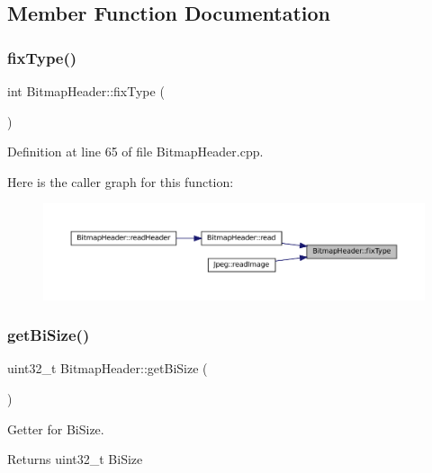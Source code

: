 \subsection{Member Function Documentation}
\mbox{\label{classBitmapHeader_aa02e59db95074c6a96a44dac03cee77b}} 
\subsubsection{\texorpdfstring{fixType()}{fixType()}}
{\footnotesize\ttfamily int Bitmap\+Header\+::fix\+Type (\begin{DoxyParamCaption}{ }\end{DoxyParamCaption})}



Definition at line 65 of file Bitmap\+Header.\+cpp.

Here is the caller graph for this function\+:\nopagebreak
\begin{figure}[H]
\begin{center}
\leavevmode
\includegraphics[width=350pt]{classBitmapHeader_aa02e59db95074c6a96a44dac03cee77b_icgraph}
\end{center}
\end{figure}
\mbox{\label{classBitmapHeader_acce4b6292e2aaf5dbd4bc10687c4fb65}} 
\subsubsection{\texorpdfstring{getBiSize()}{getBiSize()}}
{\footnotesize\ttfamily uint32\+\_\+t Bitmap\+Header\+::get\+Bi\+Size (\begin{DoxyParamCaption}{ }\end{DoxyParamCaption})}



Getter for Bi\+Size. 

\begin{DoxyReturn}{Returns}
uint32\+\_\+t Bi\+Size 
\end{DoxyReturn}


